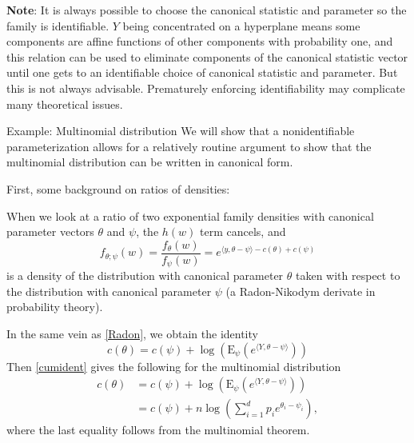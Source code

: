 \documentclass[
  ignorenonframetext,
]{beamer}
\begin{document}
\begin{frame}{}
\protect\hypertarget{section-5}{}
\textbf{Note}: It is always possible to choose the canonical statistic
and parameter so the family is identifiable. \(Y\) being concentrated on
a hyperplane means some components are affine functions of other
components with probability one, and this relation can be used to
eliminate components of the canonical statistic vector until one gets to
an identifiable choice of canonical statistic and parameter. But this is
not always advisable. Prematurely enforcing identifiability may
complicate many theoretical issues.
\end{frame}

\begin{frame}{Example: Multinomial distribution}
\protect\hypertarget{example-multinomial-distribution}{}
We will show that a nonidentifiable parameterization allows for a
relatively routine argument to show that the multinomial distribution
can be written in canonical form.

First, some background on ratios of densities:

When we look at a ratio of two exponential family densities with
canonical parameter vectors \(\theta\) and \(\psi\), the \(h(w)\) term
cancels, and \begin{equation} \label{Radon}
    f_{\theta;\psi}(w) = \frac{f_{\theta}(w)}{f_{\psi}(w)} = e^{\langle y,\theta - \psi\rangle - c(\theta) + c(\psi)}   
\end{equation} is a density of the distribution with canonical parameter
\(\theta\) taken with respect to the distribution with canonical
parameter \(\psi\) (a Radon-Nikodym derivate in probability theory).
\end{frame}

\begin{frame}{}
\protect\hypertarget{section-6}{}
In the same vein as \eqref{Radon}, we obtain the identity
\begin{equation} \label{cumident}
    c(\theta) = c(\psi) + \log\left(\mathrm{E}_{\psi}\left(e^{\langle Y, \theta - \psi \rangle}\right)\right)
\end{equation} Then \eqref{cumident} gives the following for the
multinomial distribution \begin{align*}
  c(\theta) &= c(\psi) + \log\left(\mathrm{E}_{\psi}\left(e^{\langle Y, \theta - \psi \rangle}\right)\right) \\
  &= c(\psi) + n\log\left(\sum_{i=1}^d p_ie^{\theta_i - \psi_i}\right),
\end{align*} where the last equality follows from the multinomial
theorem.
\end{frame}
\end{document}
